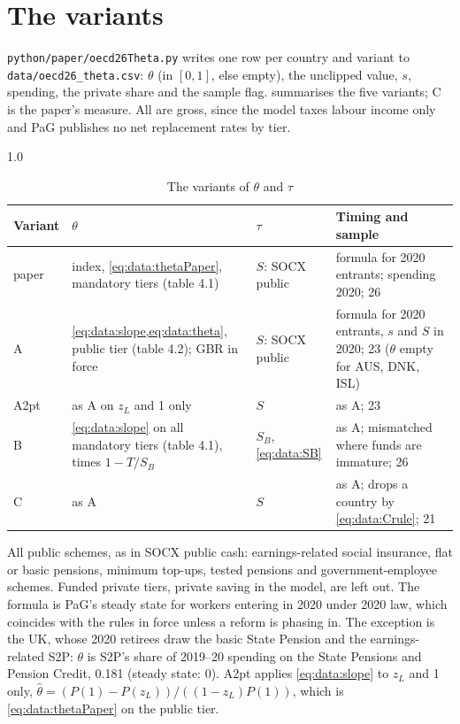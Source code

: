 \section{The variants}\label{sec:data:variants}
\texttt{python/paper/\allowbreak oecd26Theta.py} writes one row per country and variant to \texttt{data/\allowbreak oecd26\_theta.csv}: $\theta$ (in $[0,1]$, else empty), the unclipped value, $s$, spending, the private share and the sample flag.  summarises the five variants; C is the paper's measure. All are gross, since the model taxes labour income only and PaG publishes no net replacement rates by tier.

\begin{table}[htbp]
\centering
\caption{The variants of $\theta$ and $\tau$}\label{tab:data:variants}
\begin{spacing}{1.0}
\footnotesize
\begin{tabular}{@{}>{\raggedright\arraybackslash}p{1.1cm}>{\raggedright\arraybackslash}p{4.2cm}>{\raggedright\arraybackslash}p{3.0cm}>{\raggedright\arraybackslash}p{\dimexpr\linewidth-8.3cm-6\tabcolsep\relax}@{}}
\toprule
Variant & $\theta$ & $\tau$ & Timing and sample \\
\midrule
paper & index, \cref{eq:data:thetaPaper}, mandatory tiers (table 4.1) & $S$: SOCX public & formula for 2020 entrants; spending 2020; 26 \\
A & \cref{eq:data:slope,eq:data:theta}, public tier (table 4.2); GBR in force & $S$: SOCX public & formula for 2020 entrants, $s$ and $S$ in 2020; 23 ($\theta$ empty for AUS, DNK, ISL) \\
A2pt & as A on $z_L$ and 1 only & $S$ & as A; 23 \\
B & \cref{eq:data:slope} on all mandatory tiers (table 4.1), times $1 - T/S_B$ & $S_B$, \cref{eq:data:SB} & as A; mismatched where funds are immature; 26 \\
C & as A & $S$ & as A; drops a country by \cref{eq:data:Crule}; 21 \\
\bottomrule
\end{tabular}
\end{spacing}
\end{table}

All public schemes, as in SOCX public cash: earnings-related social insurance, flat or basic pensions, minimum top-ups, tested pensions and government-employee schemes. Funded private tiers, private saving in the model, are left out. The formula is PaG's steady state for workers entering in 2020 under 2020 law, which coincides with the rules in force unless a reform is phasing in. The exception is the UK, whose 2020 retirees draw the basic State Pension and the earnings-related S2P: $\theta$ is S2P's share of 2019--20 spending on the State Pensions and Pension Credit, 0.181 (steady state: 0). A2pt applies \cref{eq:data:slope} to $z_L$ and 1 only, $\hat\theta = (P(1)-P(z_L))/\left((1-z_L)P(1)\right)$, which is \cref{eq:data:thetaPaper} on the public tier.

